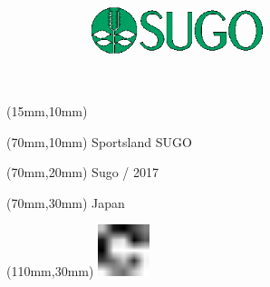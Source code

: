 \null\newpage
\begin{textblock*}{50mm}(15mm,10mm)%
\includegraphics[width=50mm]{LG/SUG.png}
\end{textblock*}
\begin{textblock*}{130mm}(70mm,10mm)%
{\fontsize{20}{20}\selectfont Sportsland SUGO}\\
\end{textblock*}
\begin{textblock*}{120mm}(70mm,20mm)%
{\fontsize{16}{16}\selectfont Sugo / 2017}\\
\end{textblock*}
\begin{textblock*}{120mm}(70mm,30mm)%
{\fontsize{12}{12}\selectfont Japan}
\end{textblock*}
\begin{textblock*}{30mm}(110mm,30mm)%
\centering
\includegraphics[height=15mm]{icons/fa-rotate-right.pdf}
\end{textblock*}
